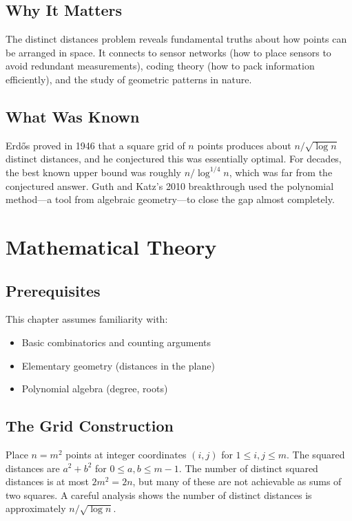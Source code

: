 \subsection{Why It Matters}
The distinct distances problem reveals fundamental truths about how points can be arranged in space. It connects to sensor networks (how to place sensors to avoid redundant measurements), coding theory (how to pack information efficiently), and the study of geometric patterns in nature.

\subsection{What Was Known}
Erd\H{o}s proved in 1946 that a square grid of $n$ points produces about $n/\sqrt{\log n}$ distinct distances, and he conjectured this was essentially optimal. For decades, the best known upper bound was roughly $n/\log^{1/4} n$, which was far from the conjectured answer. Guth and Katz's 2010 breakthrough used the polynomial method---a tool from algebraic geometry---to close the gap almost completely.

\section{Mathematical Theory}


\subsection{Prerequisites}
This chapter assumes familiarity with:
\begin{itemize}
\item Basic combinatorics and counting arguments
\item Elementary geometry (distances in the plane)
\item Polynomial algebra (degree, roots)
\end{itemize}

\subsection{The Grid Construction}

\begin{definition}
Place $n = m^2$ points at integer coordinates $(i,j)$ for $1 \leq i,j \leq m$. The squared distances are $a^2 + b^2$ for $0 \leq a,b \leq m-1$. The number of distinct squared distances is at most $2m^2 = 2n$, but many of these are not achievable as sums of two squares. A careful analysis shows the number of distinct distances is approximately $n/\sqrt{\log n}$.
\end{definition}

